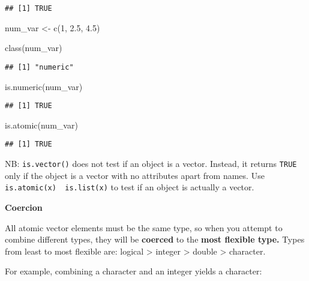 \documentclass[
]{book}
\newenvironment{Shaded}{\begin{snugshade}}{\end{snugshade}}
\newcommand{\DecValTok}[1]{\textcolor[rgb]{0.00,0.00,0.81}{#1}}
\newcommand{\FloatTok}[1]{\textcolor[rgb]{0.00,0.00,0.81}{#1}}
\newcommand{\FunctionTok}[1]{\textcolor[rgb]{0.00,0.00,0.00}{#1}}
\newcommand{\NormalTok}[1]{#1}
\newcommand{\OtherTok}[1]{\textcolor[rgb]{0.56,0.35,0.01}{#1}}
\begin{document}
\begin{verbatim}
## [1] TRUE
\end{verbatim}

\begin{Shaded}
\begin{Highlighting}[]
\NormalTok{num\_var }\OtherTok{\textless{}{-}} \FunctionTok{c}\NormalTok{(}\DecValTok{1}\NormalTok{, }\FloatTok{2.5}\NormalTok{, }\FloatTok{4.5}\NormalTok{)}

\FunctionTok{class}\NormalTok{(num\_var)}
\end{Highlighting}
\end{Shaded}

\begin{verbatim}
## [1] "numeric"
\end{verbatim}

\begin{Shaded}
\begin{Highlighting}[]
\FunctionTok{is.numeric}\NormalTok{(num\_var)}
\end{Highlighting}
\end{Shaded}

\begin{verbatim}
## [1] TRUE
\end{verbatim}

\begin{Shaded}
\begin{Highlighting}[]
\FunctionTok{is.atomic}\NormalTok{(num\_var)}
\end{Highlighting}
\end{Shaded}

\begin{verbatim}
## [1] TRUE
\end{verbatim}

NB: \texttt{is.vector()} does not test if an object is a vector. Instead, it returns \texttt{TRUE} only if the object is a vector with no attributes apart from names. Use \texttt{is.atomic(x)\ \textbar{}\textbar{}\ is.list(x)} to test if an object is actually a vector.

\textbf{Coercion}

All atomic vector elements must be the same type, so when you attempt to combine different types, they will be \textbf{coerced} to the \textbf{most flexible type.} Types from least to most flexible are: logical \textgreater{} integer \textgreater{} double \textgreater{} character.

For example, combining a character and an integer yields a character:
\end{document}
